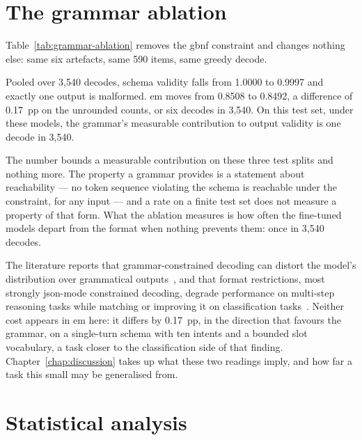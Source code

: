 \section{The grammar ablation}
\label{sec:grammar-ablation}

Table~\ref{tab:grammar-ablation} removes the \gls{gbnf} constraint and changes nothing else: same
six artefacts, same 590 items, same greedy decode.



Pooled over 3{,}540 decodes, schema validity falls from 1.0000 to 0.9997 and exactly one output is
malformed. \Gls{em} moves from 0.8508 to 0.8492, a difference of 0.17~pp on the unrounded counts,
or six decodes in 3{,}540. On this test set, under these models, the grammar's measurable contribution to output
validity is one decode in 3{,}540.

The number bounds a measurable contribution on these three test splits and nothing more. The
property a grammar provides is a statement about reachability --- no token sequence violating the
schema is reachable under the constraint, for any input --- and a rate on a finite test set does
not measure a property of that form. What the ablation measures is how often the fine-tuned models
depart from the format when nothing prevents them: once in 3{,}540 decodes.

The literature reports that grammar-constrained decoding can distort the model's distribution over
grammatical outputs~\cite{park2024}, and that format restrictions, most strongly \gls{json}-mode
constrained decoding, degrade performance on multi-step reasoning tasks while matching or improving
it on classification tasks~\cite{tam2024}. Neither cost appears in \gls{em} here: it differs by
0.17~pp, in the direction that favours the grammar, on a single-turn schema with ten intents and a
bounded slot vocabulary, a task closer to the classification side of that finding.
Chapter~\ref{chap:discussion} takes up what these two readings imply, and how far a task this small
may be generalised from.

\noautobreak
\section{Statistical analysis}
\label{sec:statistics}


